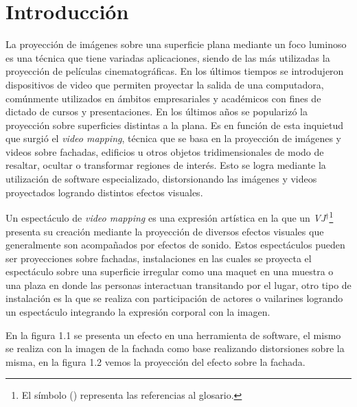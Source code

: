 ﻿\chapter{Introducción}


La proyección de imágenes sobre una superficie plana mediante un foco luminoso es una técnica que tiene variadas aplicaciones, siendo de las más utilizadas la proyección de películas cinematográficas. En los últimos tiempos se introdujeron dispositivos de video que permiten proyectar la salida de una computadora, comúnmente utilizados en ámbitos empresariales y académicos con fines de dictado de cursos y presentaciones. En los últimos años se popularizó la proyección sobre superficies distintas a la plana.%
Es en función de esta inquietud que surgió el \emph{video mapping}, técnica que se basa en la proyección de imágenes y videos sobre fachadas, edificios u otros objetos tridimensionales de modo de resaltar, ocultar o transformar regiones de interés. %
Esto se logra mediante la utilización de software especializado, distorsionando las imágenes y videos proyectados logrando distintos efectos visuales.

Un espectáculo de \emph{video mapping} es una expresión artística en la que un \emph{VJ}$^\dagger$\footnote{El símbolo (\dag) representa las referencias al glosario.} presenta su creación mediante la proyección de diversos efectos visuales que generalmente son acompañados por efectos de sonido. Estos espectáculos pueden ser proyecciones sobre fachadas, instalaciones en las cuales se proyecta el espectáculo sobre una superficie irregular como una maquet en una muestra o una plaza en donde las personas interactuan transitando por el lugar, otro tipo de instalación es la que se realiza con participación de actores o vailarines logrando un espectáculo integrando la expresión corporal con la imagen.

En la figura 1.1 se presenta un efecto en una herramienta de software, el mismo se realiza con la imagen de la fachada como base realizando distorsiones sobre la misma, en la figura 1.2 vemos la proyección del efecto sobre la fachada.

